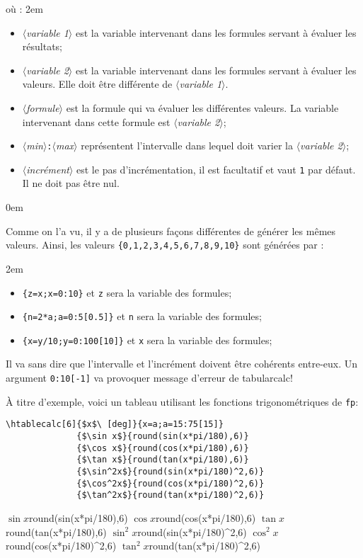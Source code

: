 \documentclass[a4paper,10pt]{article}
\newcommand\argu[1]{$\langle$\textit{#1}$\rangle$}
\newcommand\tbcalc{\textsf{tabularcalc}\xspace}
\newcommand\mywidth{0.85\linewidth}
\begin{document}
où :
\parindent2em
\begin{itemize}
	\item \argu{variable 1} est la variable intervenant dans les formules servant à évaluer les résultats;
	\item \argu{variable 2} est la variable intervenant dans les formules servant à évaluer les valeurs. Elle doit être différente de \argu{variable 1}.
	\item \argu{formule} est la formule qui va évaluer les différentes valeurs.  La variable intervenant dans cette formule est \argu{variable 2};
	\item \argu{min}\verb|:|\argu{max} représentent l'intervalle dans lequel doit varier la \argu{variable 2};
	\item \argu{incrément} est le pas d'incrémentation, il est facultatif et vaut \verb=1= par défaut. Il ne doit pas être nul.
\end{itemize}\parindent0em
\medskip

Comme on l'a vu, il y a de plusieurs façons différentes de générer les mêmes valeurs. Ainsi, les valeurs \texttt{\{0,1,2,3,4,5,6,7,8,9,10\}} sont générées par :

\parindent2em
\begin{itemize}
	\item \verb|{z=x;x=0:10}| et \og\verb=z=\fg{} sera la variable des formules;
	\item \verb|{n=2*a;a=0:5[0.5]}| et \og\verb=n=\fg{} sera la variable des formules;
	\item \verb|{x=y/10;y=0:100[10]}| et \og\verb=x=\fg{} sera la variable des formules;
\end{itemize}
\parindent0pt\medskip

Il va sans dire que l'intervalle et l'incrément doivent être cohérents entre-eux. Un argument \verb|0:10[-1]| va provoquer message d'erreur de \tbcalc !\medskip

À titre d'exemple, voici un tableau utilisant les fonctions trigonométriques de \verb|fp|:
\begin{center}
\begin{minipage}{\mywidth}
\begin{lstlisting}
\htablecalc[6]{$x$\ [deg]}{x=a;a=15:75[15]}
              {$\sin x$}{round(sin(x*pi/180),6)}
              {$\cos x$}{round(cos(x*pi/180),6)}
              {$\tan x$}{round(tan(x*pi/180),6)}
              {$\sin^2x$}{round(sin(x*pi/180)^2,6)}
              {$\cos^2x$}{round(cos(x*pi/180)^2,6)}
              {$\tan^2x$}{round(tan(x*pi/180)^2,6)}
\end{lstlisting}
\end{minipage}

              {$\sin x$}{round(sin(x*pi/180),6)}
              {$\cos x$}{round(cos(x*pi/180),6)}
              {$\tan x$}{round(tan(x*pi/180),6)}
              {$\sin^2x$}{round(sin(x*pi/180)^2,6)}
              {$\cos^2x$}{round(cos(x*pi/180)^2,6)}
              {$\tan^2x$}{round(tan(x*pi/180)^2,6)}
\end{center}
\medskip
\end{document}
